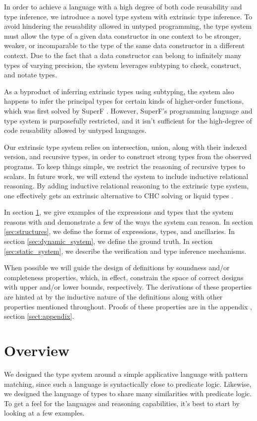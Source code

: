 \documentclass[acmsmall]{acmart}
\theoremstyle{definition}
\begin{document}
In order to achieve a language with a high degree of both code reusability and type inference, 
we introduce a novel type system with extrinsic type inference. 
To avoid hindering the reusability allowed in untyped programming, 
the type system must allow the type of a given data constructor in one context
to be stronger, weaker, or incomparable to the type of 
the same data constructor in a different context. 
Due to the fact that a data constructor can belong to infinitely many types of varying precision,
the system leverages subtyping to check, construct, and notate types.

As a byproduct of inferring extrinsic types using subtyping, the system also happens to infer the principal types for 
certain kinds of higher-order functions, which was first solved by SuperF \cite{}. 
However, SuperF's programming language and type system is purposefully 
restricted, and it isn't sufficient for the high-degree of code reusability allowed by untyped languages.

Our extrinsic type system relies on intersection, union, along with their indexed version, and recursive types, in order 
to construct strong types from the observed programs. 
To keep things simple, we restrict the reasoning of recursive types to scalars. In future work, 
we will extend the system to include inductive relational reasoning. By adding inductive relational
reasoning to the extrinsic type system, one effectively gets an extrinsic alternative to CHC solving \cite{} 
or liquid types \cite{}.


In section \ref{sec:overview}, we give examples of the expressions and types that the system reasons with
and demonstrate a few of the ways the system can reason. 
In section \ref{sec:structures}, we define the forms of expressions, types, and ancillaries. 
In section \ref{sec:dynamic_system}, we define the ground truth.
In section \ref{sec:static_system}, we describe the verification and type inference mechanisms.

When possible we will guide the design of definitions by soundness and/or completeness properties,
which, in effect, constrain the space of correct designs with upper and/or lower bounds, respectively. 
The derivations of these properties are hinted at by the inductive nature of the definitions 
along with other properties mentioned throughout.
Proofs of these properties are in the appendix , section \ref{sect:appendix}.

\section{Overview}
\label{sec:overview}
We designed the type system around a simple applicative language with pattern matching,
since such a language is syntactically close to predicate logic. Likewise,
we designed the language of types to share many similarities with predicate logic. 
To get a feel for the languages and reasoning capabilities, it's best to start by
looking at a few examples.
\end{document}
